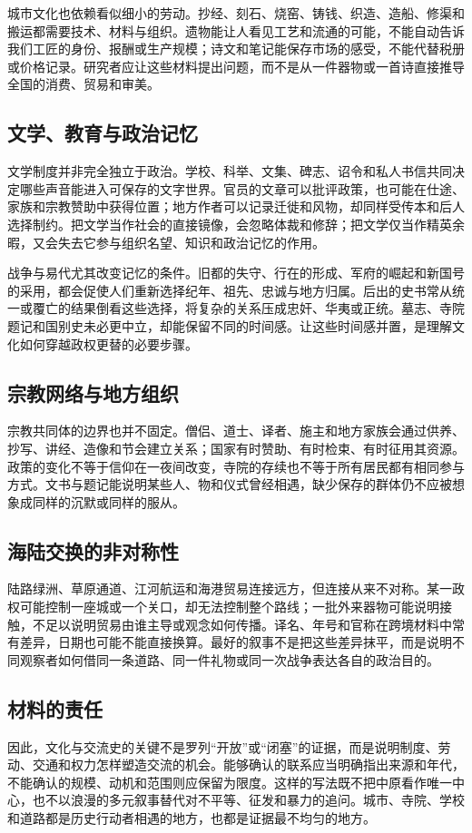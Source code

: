 城市文化也依赖看似细小的劳动。抄经、刻石、烧窑、铸钱、织造、造船、修渠和搬运都需要技术、材料与组织。遗物能让人看见工艺和流通的可能，不能自动告诉我们工匠的身份、报酬或生产规模；诗文和笔记能保存市场的感受，不能代替税册或价格记录。研究者应让这些材料提出问题，而不是从一件器物或一首诗直接推导全国的消费、贸易和审美。

\subsection{文学、教育与政治记忆}
文学制度并非完全独立于政治。学校、科举、文集、碑志、诏令和私人书信共同决定哪些声音能进入可保存的文字世界。官员的文章可以批评政策，也可能在仕途、家族和宗教赞助中获得位置；地方作者可以记录迁徙和风物，却同样受传本和后人选择制约。把文学当作社会的直接镜像，会忽略体裁和修辞；把文学仅当作精英余暇，又会失去它参与组织名望、知识和政治记忆的作用。

战争与易代尤其改变记忆的条件。旧都的失守、行在的形成、军府的崛起和新国号的采用，都会促使人们重新选择纪年、祖先、忠诚与地方归属。后出的史书常从统一或覆亡的结果倒看这些选择，将复杂的关系压成忠奸、华夷或正统。墓志、寺院题记和国别史未必更中立，却能保留不同的时间感。让这些时间感并置，是理解文化如何穿越政权更替的必要步骤。

\subsection{宗教网络与地方组织}
宗教共同体的边界也并不固定。僧侣、道士、译者、施主和地方家族会通过供养、抄写、讲经、造像和节会建立关系；国家有时赞助、有时检束、有时征用其资源。政策的变化不等于信仰在一夜间改变，寺院的存续也不等于所有居民都有相同参与方式。文书与题记能说明某些人、物和仪式曾经相遇，缺少保存的群体仍不应被想象成同样的沉默或同样的服从。

\subsection{海陆交换的非对称性}
陆路绿洲、草原通道、江河航运和海港贸易连接远方，但连接从来不对称。某一政权可能控制一座城或一个关口，却无法控制整个路线；一批外来器物可能说明接触，不足以说明贸易由谁主导或观念如何传播。译名、年号和官称在跨境材料中常有差异，日期也可能不能直接换算。最好的叙事不是把这些差异抹平，而是说明不同观察者如何借同一条道路、同一件礼物或同一次战争表达各自的政治目的。

\subsection{材料的责任}
因此，文化与交流史的关键不是罗列“开放”或“闭塞”的证据，而是说明制度、劳动、交通和权力怎样塑造交流的机会。能够确认的联系应当明确指出来源和年代，不能确认的规模、动机和范围则应保留为限度。这样的写法既不把中原看作唯一中心，也不以浪漫的多元叙事替代对不平等、征发和暴力的追问。城市、寺院、学校和道路都是历史行动者相遇的地方，也都是证据最不均匀的地方。

